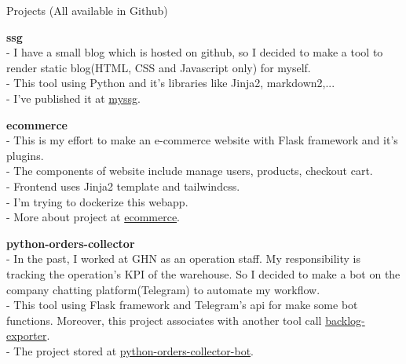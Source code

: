 \documentclass{resume} %
\begin{document}
\begin{rSection}{Projects (All available in Github)}

{\bf ssg}
\\- I have a small blog which is hosted on github, so I decided to make a tool to render static blog(HTML, CSS and Javascript only) for myself.
\\- This tool using Python and it's libraries like Jinja2, markdown2,...
\\- I've published it at \href{https://pypi.org/project/myssg/}{myssg}.

{\bf ecommerce}
\\- This is my effort to make an e-commerce website with Flask framework and it's plugins.
\\- The components of website include manage users, products, checkout cart.
\\- Frontend uses Jinja2 template and tailwindcss.
\\- I'm trying to dockerize this webapp.
\\- More about project at \href{https://github.com/tranvietphuoc/ecommerce}{ecommerce}.


{\bf python-orders-collector}
\\- In the past, I worked at GHN as an operation staff. My responsibility is tracking the operation's KPI of the warehouse. So I decided to make a bot on the company chatting platform(Telegram) to automate my workflow.
\\- This tool using Flask framework and Telegram's api for make some bot functions. Moreover, this project associates with another tool call \href{https://github.com/tranvietphuoc/backlog-exporter}{backlog-exporter}.
\\- The project stored at \href{https://github.com/tranvietphuoc/python-orders-collector-bot}{python-orders-collector-bot}.



\end{rSection}
\end{document}
